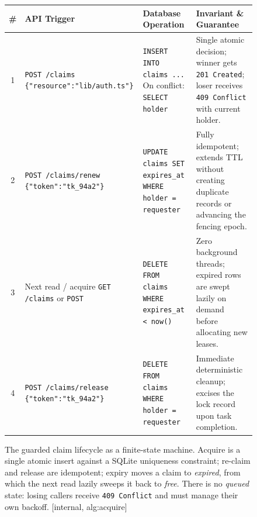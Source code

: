 \begin{figure}[H]
\medskip
\begingroup\footnotesize
\begin{tabularx}{\linewidth}{@{}c >{\raggedright\arraybackslash}p{2.6cm} >{\raggedright\arraybackslash}p{3.1cm} >{\raggedright\arraybackslash}X@{}}
\toprule
\textbf{\#} & \textbf{API Trigger} & \textbf{Database Operation} & \textbf{Invariant \& Guarantee} \\
\midrule
1 & \texttt{POST /claims} \newline \texttt{\{"resource":"lib/auth.ts"\}} & \texttt{INSERT INTO claims ...} \newline On conflict: \texttt{SELECT holder} & Single atomic decision; winner gets \texttt{201 Created}; loser receives \texttt{409 Conflict} with current holder. \\
2 & \texttt{POST /claims/renew} \newline \texttt{\{"token":"tk\_94a2"\}} & \texttt{UPDATE claims SET expires\_at} \newline \texttt{WHERE holder = requester} & Fully idempotent; extends TTL without creating duplicate records or advancing the fencing epoch. \\
3 & Next read / acquire \newline \texttt{GET /claims} or \texttt{POST} & \texttt{DELETE FROM claims} \newline \texttt{WHERE expires\_at < now()} & Zero background threads; expired rows are swept lazily on demand before allocating new leases. \\
4 & \texttt{POST /claims/release} \newline \texttt{\{"token":"tk\_94a2"\}} & \texttt{DELETE FROM claims} \newline \texttt{WHERE holder = requester} & Immediate deterministic cleanup; excises the lock record upon task completion. \\
\bottomrule
\end{tabularx}\endgroup
\caption{The guarded claim lifecycle as a finite-state machine. Acquire is a single atomic insert against a SQLite uniqueness constraint; re-claim and release are idempotent; expiry moves a claim to \emph{expired}, from which the next read lazily sweeps it back to \emph{free}. There is no \emph{queued} state: losing callers receive \texttt{409 Conflict} and must manage their own backoff. [internal, alg:acquire]}
\label{fig:swk-claim-lifecycle}
\end{figure}
